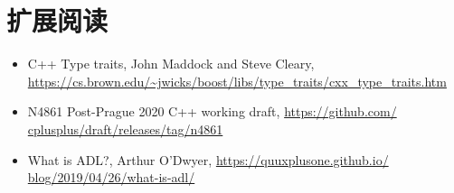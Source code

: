 \section{扩展阅读}
\begin{itemize}
\item
C++ Type traits, John Maddock and Steve Cleary, \url{https://cs.brown.edu/~jwicks/boost/libs/type_traits/cxx_type_traits.htm}

\item
N4861 Post-Prague 2020 C++ working draft, \url{https://github.com/ cplusplus/draft/releases/tag/n4861}

\item
What is ADL?, Arthur O’Dwyer, \url{https://quuxplusone.github.io/ blog/2019/04/26/what-is-adl/}

\end{itemize}